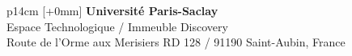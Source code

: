 \documentclass[12pt,a4paper]{reedthesis}
\begin{document}
% 
% 


\vfill
{}\selectfont
\noindent\begin{tabular}{p{14cm}}
[+0mm]{\small {\color{Prune} {\bf Université Paris-Saclay}\\
{\scriptsize Espace Technologique / Immeuble Discovery}\\
{\scriptsize  Route de l’Orme aux Merisiers RD 128 / 91190 Saint-Aubin, France}}}\\\mbox{}
\end{tabular}

\end{document}
